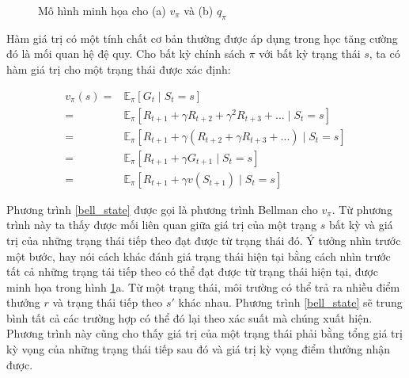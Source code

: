 \begin{figure}
		\caption[Mô hình minh họa cho hàm giá trị]{Mô hình minh họa cho (a) $v_{\pi}$ và (b) $q_{\pi}$}
		\label{backup_diagram}
	\end{figure}
	
	Hàm giá trị có một tính chất cơ bản thường được áp dụng trong học tăng cường đó là mối quan hệ đệ quy. Cho bất kỳ chính sách $\pi$ với bất kỳ trạng thái $s$, ta có hàm giá trị cho một trạng thái được xác định:
	
	\begin{align}
		\label{bell_state}
			v_{\pi}(s) = {}& \mathbb{E}_{\pi}\left [\mathit{G}_t \mid \mathit{S}_{t} = s\right ] \nonumber \\
			= {}& \mathbb{E}_{\pi}\left [ \mathit{R}_{t+1} + \gamma \mathit{R}_{t+2} + \gamma^{2} \mathit{R}_{t+3} + ... \mid \mathit{S}_t = s  \right ] \nonumber \\
			= {}& \mathbb{E}_{\pi}\left [ \mathit{R}_{t+1} + \gamma( {R}_{t+2} + \gamma \mathit{R}_{t+3} + ...) \mid \mathit{S}_t = s  \right ] \nonumber \\
			= {}& \mathbb{E}_{\pi}\left [ \mathit{R}_{t+1} + \gamma\mathit{G}_{t + 1} \mid \mathit{S}_t = s  \right ] \nonumber \\
			= {}& \mathbb{E}_{\pi}\left [ \mathit{R}_{t+1} + \gamma v(\mathit{S}_{t+1}) \mid \mathit{S}_t = s  \right ]
	\end{align}
	
	Phương trình \ref{bell_state} được gọi là phương trình Bellman cho $v_{\pi}$. Từ phương trình này ta thấy được mối liên quan giữa giá trị của một trạng $s$ bất kỳ và giá trị của những trạng thái tiếp theo đạt được từ trạng thái đó. Ý tưởng nhìn trước một bước, hay nói cách khác đánh giá trạng thái hiện tại bằng cách nhìn trước tất cả những trạng tái tiếp theo có thể đạt được từ trạng thái hiện tại, được minh họa trong hình \ref{backup_diagram}a. Từ một trạng thái, môi trường có thể trả ra nhiều điểm thưởng $r$ và trạng thái tiếp theo $s'$ khác nhau. Phương trình \ref{bell_state} sẽ trung bình tất cả các trường hợp có thể đó lại theo xác suất mà chúng xuất hiện. Phương trình này cũng cho thấy giá trị của một trạng thái phải bằng tổng giá trị kỳ vọng của những trạng thái tiếp sau đó và giá trị kỳ vọng điểm thưởng nhận được.
	
